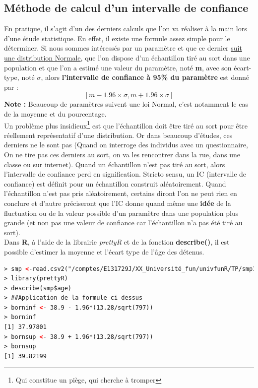 \subsection{Méthode de calcul d'un intervalle de confiance}
En pratique, il s'agit d'un des derniers calculs que l'on va réaliser à la main lors d'une étude statistique.\newline
En effet, il existe une formule assez simple pour le déterminer.\newline
Si nous sommes intéressés par un paramètre et que ce dernier \underline{suit une distribution Normale}, que l'on dispose d'un échantillon tiré au sort dans une population et que l'on a estimé une valeur du paramètre, noté \textbf{m}, avec son écart-type, noté $\sigma$, alors \textbf{l'intervalle de confiance à 95\% du paramètre} est donné par : 
$$[m-1.96\times \sigma , m+1.96\times\sigma]$$
\textbf{Note : } Beaucoup de paramètres suivent une loi Normal, c'est notamment le cas de la moyenne et du pourcentage.\newline
\\
Un problème plus insidieux\footnote{Qui constitue un piège, qui cherche à tromper} est que l'échantillon doit être tiré au sort pour être réellement représentatif d'une distribution. Or dans beaucoup d'études, ces derniers ne le sont pas (Quand on interroge des individus avec un questionnaire, On ne tire pas ces derniers au sort, on va les rencontrer dans la rue, dans une classe ou sur internet).\newline
Quand un échantillon n'est pas tiré au sort, alors l'intervalle de confiance perd en signification. Stricto sensu, un IC (intervalle de confiance) est définit pour un échantillon construit aléatoirement. Quand l'échantillon n'est pas pris aléatoirement, certains diront l'on ne peut rien en conclure et d'autre préciseront que l'IC donne quand même une \textbf{idée} de la fluctuation ou de la valeur possible d'un paramètre dans une population plus grande (et non pas une valeur de confiance car l'échantillon n'a pas été tiré au sort).\newline
\\
Dans \textbf{R}, à l'aide de la librairie \textit{prettyR} et de la fonction \textbf{describe()}, il est possible d'estimer la moyenne et l'écart type de l'âge des détenus.
\begin{lstlisting}[language=html]
> smp <-read.csv2("/comptes/E131729J/XX_Université_fun/univfunR/TP/smp1.csv")
> library(prettyR)
> describe(smp$age)
> ##Application de la formule ci dessus
> borninf <- 38.9 - 1.96*(13.28/sqrt(797))
> borninf
[1] 37.97801
> bornsup <- 38.9 + 1.96*(13.28/sqrt(797))
> bornsup
[1] 39.82199
\end{lstlisting}
